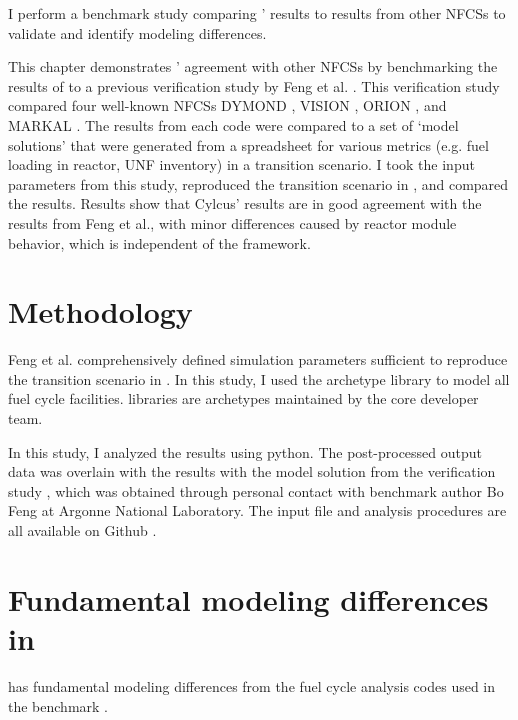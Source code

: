 I perform a benchmark study comparing \Cyclus' results
to results from other \glspl{NFCS} to validate \Cyclus
and identify modeling differences.

This chapter demonstrates \Cyclus' agreement with other
\glspl{NFCS} by benchmarking the results of \Cyclus to
a previous verification study by Feng et al. \cite{feng_standardized_2016}.
This verification study compared four well-known \glspl{NFCS}
DYMOND \cite{yacout_modeling_2005},
VISION \cite{jacobson_verifiable_2010},
ORION \cite{gregg_analysis_2012}, and
MARKAL \cite{shay_epa_2006}. The results from each code were compared to a
set of `model solutions' that were generated from a spreadsheet
for various metrics (e.g. fuel loading in reactor, \gls{UNF} inventory)
in a transition scenario. I took the input parameters from this study,
reproduced the transition scenario in \Cyclus, and compared the results.
Results show that Cylcus' results are in good agreement with the results
from Feng et al., with minor differences caused by reactor module behavior,
which is independent of the framework.

\section{Methodology}

Feng et al. comprehensively defined simulation parameters
sufficient to reproduce the transition scenario in \Cyclus.
In this study, I used the \Cycamore \cite{huff_fundamental_2016}
archetype library to model
all fuel cycle facilities. \Cycamore libraries are
archetypes maintained by the core developer team.

In this study, I analyzed the \Cyclus results
using python. The post-processed
output data was overlain with the results with the
model solution from the verification study \cite{feng_standardized_2016},
which was obtained through personal contact with
benchmark author Bo Feng at Argonne National Laboratory.
The input file and analysis procedures are all available on Github \cite{bae_arfc/transition-scenarios:_2018}.



\section{Fundamental modeling differences in \Cyclus}

\Cyclus has fundamental modeling differences from the fuel cycle analysis codes
used in the benchmark \cite{feng_standardized_2016}.

